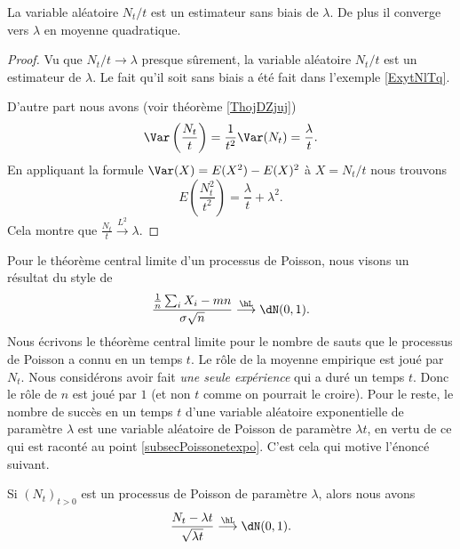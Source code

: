 \begin{proposition}
    La variable aléatoire \( N_t/t\) est un estimateur sans biais de \( \lambda\). De plus il converge vers \( \lambda\) en moyenne quadratique.
\end{proposition}

\begin{proof}
    Vu que \( N_t/t\to\lambda\) presque sûrement, la variable aléatoire \( N_t/t\) est un estimateur de \( \lambda\). Le fait qu'il soit sans biais a été fait dans l'exemple \ref{ExytNlTq}.

    D'autre part nous avons (voir théorème \ref{ThojDZjuj})
    \begin{equation}
        \Var\left( \frac{ N_t }{ t } \right)=\frac{1}{ t^2 }\Var(N_t)=\frac{ \lambda }{ t }.
    \end{equation}
    En appliquant la formule \( \Var(X)=E(X^2)-E(X)^2\) à \( X=N_t/t\) nous trouvons
    \begin{equation}
        E\left( \frac{ N_t^2 }{ t^2 } \right)=\frac{ \lambda }{ t }+\lambda^2.
    \end{equation}
    Cela montre que \( \frac{ N_t }{ t }\stackrel{L^2}{\longrightarrow}\lambda\).
\end{proof}

Pour le théorème central limite d'un processus de Poisson, nous visons un résultat du style de
\begin{equation}
    \frac{ \frac{1}{ n }\sum_iX_i-mn }{ \sigma\sqrt{n} }\stackrel{\hL}{\longrightarrow}\dN(0,1).
\end{equation}
Nous écrivons le théorème central limite pour le nombre de sauts que le processus de Poisson a connu en un temps \( t\). Le rôle de la moyenne empirique est joué par \( N_t\). Nous considérons avoir fait \emph{une seule expérience} qui a duré un temps \( t\). Donc le rôle de \( n\) est joué par \( 1\) (et non \( t\) comme on pourrait le croire). Pour le reste, le nombre de succès en un temps \( t\) d'une variable aléatoire exponentielle de paramètre \( \lambda\) est une variable aléatoire de Poisson de paramètre \( \lambda t\), en vertu de ce qui est raconté au point \ref{subsecPoissonetexpo}. C'est cela qui motive l'énoncé suivant.

\begin{theorem}  \label{ThoCSuLLo}
    Si \( (N_t)_{t>0}\) est un processus de Poisson de paramètre \( \lambda\), alors nous avons
    \begin{equation}
        \frac{ N_t-\lambda t }{ \sqrt{\lambda t} }\stackrel{\hL}{\longrightarrow}\dN(0,1).
    \end{equation}
\end{theorem}

